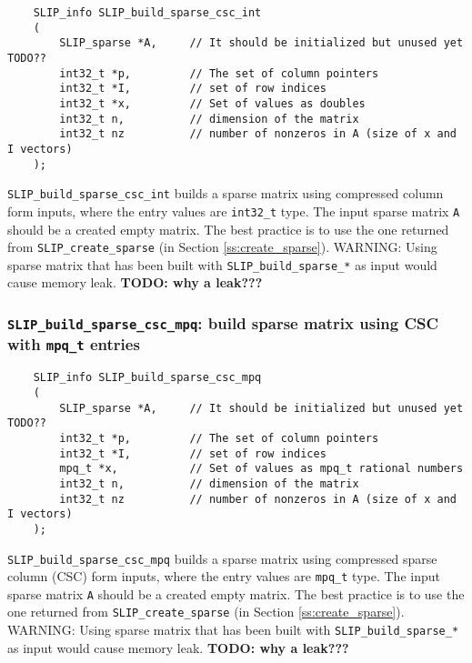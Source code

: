 \documentclass[12pt]{article}
\theoremstyle{definition}
\begin{document}
\begin{mdframed}[userdefinedwidth=6in]
{\footnotesize
\begin{verbatim}
    SLIP_info SLIP_build_sparse_csc_int
    (
        SLIP_sparse *A,     // It should be initialized but unused yet TODO??
        int32_t *p,         // The set of column pointers
        int32_t *I,         // set of row indices
        int32_t *x,         // Set of values as doubles
        int32_t n,          // dimension of the matrix
        int32_t nz          // number of nonzeros in A (size of x and I vectors)
    );
\end{verbatim}
} \end{mdframed}

\verb|SLIP_build_sparse_csc_int| builds a sparse matrix using compressed column
form inputs, where the entry values are \verb|int32_t| type. The input sparse
matrix \verb|A| should be a created empty matrix. The best practice is
to use the one returned from \verb|SLIP_create_sparse| (in Section
\ref{ss:create_sparse}). WARNING: Using sparse matrix that has been built with
\verb|SLIP_build_sparse_*| as input would cause memory leak.
{\bf TODO: why a leak???} %

\cprotect\subsubsection{\verb|SLIP_build_sparse_csc_mpq|: build sparse matrix using CSC with \verb|mpq_t| entries}
\label{s:user:build_sparse_csc_mpq}

\begin{mdframed}[userdefinedwidth=6in]
{\footnotesize
\begin{verbatim}
    SLIP_info SLIP_build_sparse_csc_mpq
    (
        SLIP_sparse *A,     // It should be initialized but unused yet TODO??
        int32_t *p,         // The set of column pointers
        int32_t *I,         // set of row indices
        mpq_t *x,           // Set of values as mpq_t rational numbers
        int32_t n,          // dimension of the matrix
        int32_t nz          // number of nonzeros in A (size of x and I vectors)
    );
\end{verbatim}
} \end{mdframed}

\verb|SLIP_build_sparse_csc_mpq| builds a sparse matrix using compressed
sparse column (CSC) form inputs, where the entry values are \verb|mpq_t| type.
The input sparse matrix \verb|A| should be a created empty matrix. The
best practice is to use the one returned from \verb|SLIP_create_sparse| (in
Section \ref{ss:create_sparse}). WARNING: Using sparse matrix that has been
built with \verb|SLIP_build_sparse_*| as input would cause memory leak.
{\bf TODO: why a leak???} %
\end{document}
